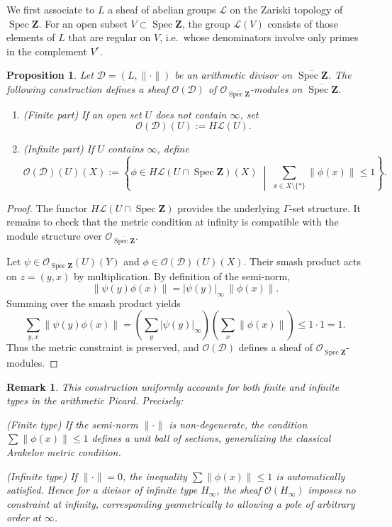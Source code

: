 \documentclass[11pt,a4paper]{article}
\newcommand{\Z}{\mathbf{Z}}
\def\spzb{\overline{\Spec \Z}}
\newcommand{\Spec}{\operatorname{Spec}}
\theoremstyle{plain}
\newtheorem{prop}[thm]{Proposition}
\newtheorem{rem}[thm]{Remark}
\theoremstyle{definition} %
\begin{document}
We first associate to $L$ a sheaf of abelian groups $\mathcal L$ on the Zariski
topology of $\Spec\Z$.
For an open subset $V\subset\Spec\Z$, the group $\mathcal L(V)$ consists of those
elements of $L$ that are regular on $V$, i.e.\ whose denominators involve only
primes in the complement $V^c$.

\begin{prop}
Let $\mathcal D=(L,\|\cdot\|)$ be an arithmetic divisor on $\spzb$.
The following construction defines a sheaf
$\mathcal O(\mathcal D)$ of $\mathcal O_{\spzb}$-modules on $\spzb$.
\begin{enumerate}
\item(Finite part)
If an open set $U$ does not contain $\infty$, set
\[
\mathcal O(\mathcal D)(U):=H\mathcal L(U).
\]

\item(Infinite part)
If $U$ contains $\infty$, define
\[
\mathcal O(\mathcal D)(U)(X)
:=
\left\{
\phi\in H\mathcal L(U\cap\Spec\Z)(X)
\;\middle|\;
\sum_{x\in X\setminus\{*\}}\|\phi(x)\|\le 1
\right\}.
\]
\end{enumerate}
\end{prop}

\begin{proof}
The functor $H\mathcal L(U\cap\Spec\Z)$ provides the underlying $\Gamma$-set
structure.
It remains to check that the metric condition at infinity is compatible with the
module structure over $\mathcal O_{\spzb}$.

Let $\psi\in\mathcal O_{\spzb}(U)(Y)$ and
$\phi\in\mathcal O(\mathcal D)(U)(X)$.
Their smash product acts on $z=(y,x)$ by multiplication.
By definition of the semi-norm,
\[
\|\psi(y)\phi(x)\|=|\psi(y)|_\infty\,\|\phi(x)\|.
\]
Summing over the smash product yields
\[
\sum_{y,x}\|\psi(y)\phi(x)\|
=
\left(\sum_y|\psi(y)|_\infty\right)
\left(\sum_x\|\phi(x)\|\right)
\le 1\cdot 1=1.
\]
Thus the metric constraint is preserved, and $\mathcal O(\mathcal D)$ defines a
sheaf of $\mathcal O_{\spzb}$-modules.
\end{proof}

\begin{rem}
This construction uniformly accounts for both finite and infinite types in the
arithmetic Picard. Precisely:\vspace{.03in}

(Finite type)
If the semi-norm $\|\cdot\|$ is non-degenerate, the condition
$\sum\|\phi(x)\|\le 1$ defines a unit ball of sections, generalizing the classical
Arakelov metric condition.\vspace{.03in}

(Infinite type)
If $\|\cdot\|=0$, the inequality $\sum\|\phi(x)\|\le 1$ is automatically satisfied.
Hence for a divisor of infinite type $H_\infty$, the sheaf
$\mathcal O(H_\infty)$ imposes no constraint at infinity, corresponding
geometrically to allowing a pole of arbitrary order at $\infty$.

\end{rem}
\end{document}
